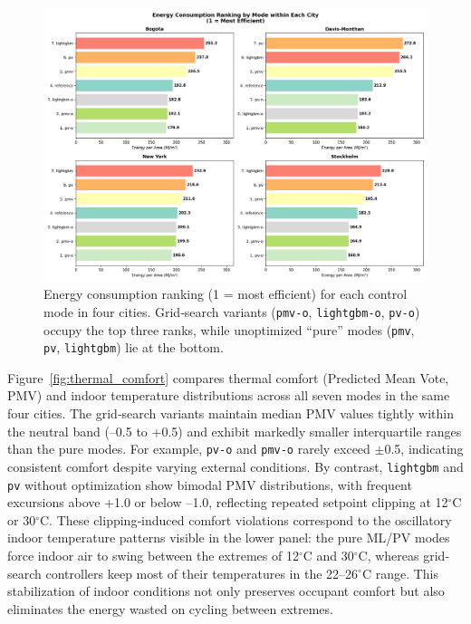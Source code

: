\begin{figure}[h!]
    \centering
    \includegraphics[width=\linewidth]{figs/energy_consumption_ranking_by_mode_within_each_city.png}
    \caption{Energy consumption ranking (1 = most efficient) for each control mode in four cities. Grid‐search variants (\texttt{pmv-o}, \texttt{lightgbm-o}, \texttt{pv-o}) occupy the top three ranks, while unoptimized “pure” modes (\texttt{pmv}, \texttt{pv}, \texttt{lightgbm}) lie at the bottom.}
    \label{fig:energy_ranking}
\end{figure}

Figure~\ref{fig:thermal_comfort} compares thermal comfort (Predicted Mean Vote, PMV) and indoor temperature distributions across all seven modes in the same four cities. The grid‐search variants maintain median PMV values tightly within the neutral band (–0.5 to +0.5) and exhibit markedly smaller interquartile ranges than the pure modes. For example, \texttt{pv-o} and \texttt{pmv-o} rarely exceed $\pm$0.5, indicating consistent comfort despite varying external conditions. By contrast, \texttt{lightgbm} and \texttt{pv} without optimization show bimodal PMV distributions, with frequent excursions above +1.0 or below –1.0, reflecting repeated setpoint clipping at 12$^\circ$C or 30$^\circ$C. These clipping‐induced comfort violations correspond to the oscillatory indoor temperature patterns visible in the lower panel: the pure ML/PV modes force indoor air to swing between the extremes of 12$^\circ$C and 30$^\circ$C, whereas grid‐search controllers keep most of their temperatures in the 22–26$^\circ$C range. This stabilization of indoor conditions not only preserves occupant comfort but also eliminates the energy wasted on cycling between extremes.

